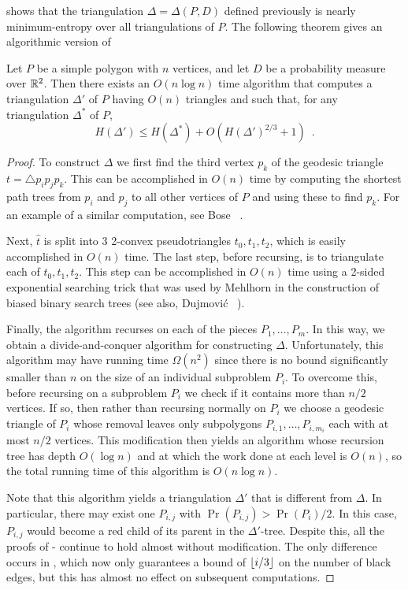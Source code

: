 \documentclass[lotsofwhite]{patmorin}
\newcommand{\z}[1]{{\hat{#1}}}
\begin{document}
 shows that the triangulation
$\Delta=\Delta(P,D)$ defined previously is nearly minimum-entropy over
all triangulations of $P$.  The following theorem gives an algorithmic
version of 

\begin{thm}
Let $P$ be a simple polygon with $n$ vertices, and let $D$ be a
probability measure over $\mathbb{R}^2$.  Then there exists an $O(n\log n)$
time algorithm that computes a triangulation $\Delta'$ of $P$ having
$O(n)$ triangles and such that, for any triangulation $\Delta^*$ of
$P$,
\[
    H(\Delta') \le H(\Delta^*) + O(H(\Delta')^{2/3}+1) \enspace .
\]
\end{thm}

\begin{proof}
To construct $\Delta$ we first find the third vertex $p_k$ of the
geodesic triangle $t=\triangle p_i p_j p_k$.  This can be accomplished
in $O(n)$ time by computing the shortest path trees from $p_i$ and
$p_j$ to all other vertices of $P$ and using these to find $p_k$.  For
an example of a similar computation, see Bose \etal\
\cite[Section~2.2]{bdhlim07}.

Next, $\z t$ is split into 3 2-convex pseudotriangles $t_0,t_1,t_2$,
which is easily accomplished in $O(n)$ time.  The last step, before
recursing, is to triangulate each of $t_0,t_1,t_2$.  This step can be
accomplished in $O(n)$ time using a 2-sided exponential searching
trick that was used by Mehlhorn \cite{m75} in the construction of
biased binary search trees (see also, Dujmovi\'c \etal\
\cite[Theorem~1]{cdilm08}).

Finally, the algorithm recurses on each of the pieces
$P_1,\ldots,P_m$.  In this way, we obtain a divide-and-conquer
algorithm for constructing $\Delta$.  Unfortunately, this algorithm
may have running time $\Omega(n^2)$ since there is no bound
significantly smaller than $n$ on the size of an individual subproblem
$P_i$.  To overcome this, before recursing on a subproblem $P_i$ we
check if it contains more than $n/2$ vertices.  If so, then rather
than recursing normally on $P_i$ we choose a geodesic triangle of
$P_i$ whose removal leaves only subpolygons $P_{i,1},\ldots,P_{i,m_i}$
each with at most $n/2$ vertices.  This modification then yields an
algorithm whose recursion tree has depth $O(\log n)$ and at which the
work done at each level is $O(n)$, so the total running time of this
algorithm is $O(n\log n)$.

Note that this algorithm yields a triangulation $\Delta'$ that is
different from $\Delta$.  In particular, there may exist one $P_{i,j}$
with $\Pr(P_{i,j})>\Pr(P_i)/2$.  In this case, $P_{i,j}$ would become
a red child of its parent in the $\Delta'$-tree.  Despite this, all
the proofs of \lemref{A}-\lemref{Z} continue to hold almost without
modification.  The only difference occurs in \lemref{t-red-black},
which now only guarantees a bound of $\left\lfloor i/3 \right\rfloor$ on the number of
black edges, but this has almost no effect on subsequent computations.


\end{proof}
\end{document}
